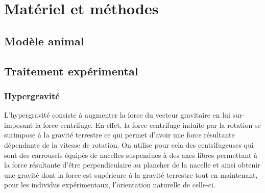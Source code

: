 \section{Matériel et méthodes}
\subsection{Modèle animal}
\lipsum[1] \cite{bentley:1999}
\subsection{Traitement expérimental}
\subsubsection{Hypergravité} \label{descrip_centri}
L'hypergravité consiste à augmenter la force du vecteur gravitaire en lui sur-imposant la force centrifuge. En effet, la force centrifuge induite par la rotation se surimpose à la gravité terrestre ce qui permet d'avoir une force résultante dépendante de la vitesse de rotation. On utilise pour cela des centrifugeuses qui sont des carrousels équipés de nacelles suspendues à des axes libres permettant à la force résultante d'être perpendiculaire au plancher de la nacelle et ainsi obtenir une \og gravité \fg{} dont la force est supérieure à la gravité terrestre tout en maintenant, pour les individus expérimentaux, l'orientation \og naturelle \fg{} de celle-ci.
\lipsum[1-5]
